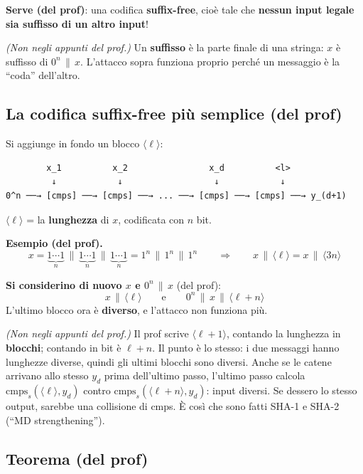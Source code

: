 \textbf{Serve (del prof)}: una codifica \textbf{suffix-free}, cioè tale che \textbf{nessun input legale sia suffisso di un altro input}!

\emph{(Non negli appunti del prof.)} Un \textbf{suffisso} è la parte finale di una stringa: \(x\) è suffisso di \(0^n \,\|\, x\). L'attacco sopra funziona proprio perché un messaggio è la ``coda'' dell'altro.

\subsection{La codifica suffix-free più semplice (del prof)}

Si aggiunge in fondo un blocco \(\langle \ell \rangle\):

\begin{verbatim}
        x_1          x_2                x_d          <l>
         ↓            ↓                  ↓            ↓
0^n ──→ [cmps] ──→ [cmps] ──→ ... ──→ [cmps] ──→ [cmps] ──→ y_(d+1)
\end{verbatim}

\(\langle \ell \rangle\) = la \textbf{lunghezza} di \(x\), codificata con \(n\) bit.

\textbf{Esempio (del prof).}
\[
x = \underbrace{1 \cdots 1}_{n} \,\|\, \underbrace{1 \cdots 1}_{n} \,\|\, \underbrace{1 \cdots 1}_{n} = 1^n \,\|\, 1^n \,\|\, 1^n
\qquad \Longrightarrow \qquad x \,\|\, \langle \ell \rangle = x \,\|\, \langle 3n \rangle
\]

\textbf{Si considerino di nuovo \(x\) e \(0^n \,\|\, x\)} (del prof):
\[
x \,\|\, \langle \ell \rangle \qquad \text{e} \qquad 0^n \,\|\, x \,\|\, \langle \ell + n \rangle
\]
L'ultimo blocco ora è \textbf{diverso}, e l'attacco non funziona più.

\begin{nota}
\emph{(Non negli appunti del prof.)} Il prof scrive \(\langle \ell + 1 \rangle\), contando la lunghezza in \textbf{blocchi}; contando in bit è \(\ell + n\). Il punto è lo stesso: i due messaggi hanno lunghezze diverse, quindi gli ultimi blocchi sono diversi. Anche se le catene arrivano allo stesso \(y_d\) prima dell'ultimo passo, l'ultimo passo calcola \(\text{cmps}_s(\langle \ell \rangle, y_d)\) contro \(\text{cmps}_s(\langle \ell + n \rangle, y_d)\): input diversi. Se dessero lo stesso output, sarebbe una collisione di cmps. È così che sono fatti SHA-1 e SHA-2 (``MD strengthening'').
\end{nota}

\subsection{Teorema (del prof)}

